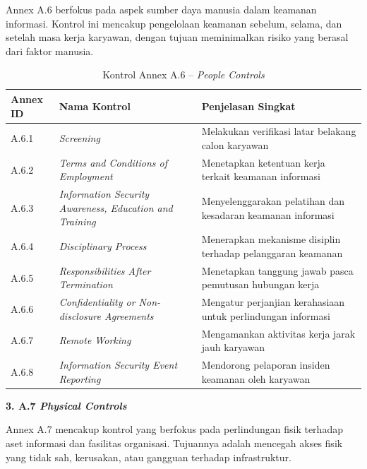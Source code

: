Annex A.6 berfokus pada aspek sumber daya manusia dalam keamanan informasi. Kontrol ini mencakup pengelolaan keamanan sebelum, selama, dan setelah masa kerja karyawan, dengan tujuan meminimalkan risiko yang berasal dari faktor manusia.

\begin{table}[H]
\centering
\small
\caption{Kontrol Annex A.6 -- \textit{People Controls} \cite{isoiec20227001}}
\label{tab:annex_a6}
\begin{tabular}{|P{1.6cm}|P{5.0cm}|P{6.4cm}|}
\hline
\textbf{Annex ID} & \textbf{Nama Kontrol} & \textbf{Penjelasan Singkat} \\
\hline
A.6.1 & \textit{Screening}                                                    & Melakukan verifikasi latar belakang calon karyawan \\
\hline
A.6.2 & \textit{Terms and Conditions of Employment}                           & Menetapkan ketentuan kerja terkait keamanan informasi \\
\hline
A.6.3 & \textit{Information Security Awareness, Education and Training}       & Menyelenggarakan pelatihan dan kesadaran keamanan informasi \\
\hline
A.6.4 & \textit{Disciplinary Process}                                         & Menerapkan mekanisme disiplin terhadap pelanggaran keamanan \\
\hline
A.6.5 & \textit{Responsibilities After Termination}                           & Menetapkan tanggung jawab pasca pemutusan hubungan kerja \\
\hline
A.6.6 & \textit{Confidentiality or Non-disclosure Agreements}                 & Mengatur perjanjian kerahasiaan untuk perlindungan informasi \\
\hline
A.6.7 & \textit{Remote Working}                                               & Mengamankan aktivitas kerja jarak jauh karyawan \\
\hline
A.6.8 & \textit{Information Security Event Reporting}                         & Mendorong pelaporan insiden keamanan oleh karyawan \\
\hline
\end{tabular}
\end{table}

\vspace{4pt}
\noindent\textbf{3. A.7 \textit{Physical Controls}}

Annex A.7 mencakup kontrol yang berfokus pada perlindungan fisik terhadap aset informasi dan fasilitas organisasi. Tujuannya adalah mencegah akses fisik yang tidak sah, kerusakan, atau gangguan terhadap infrastruktur.

